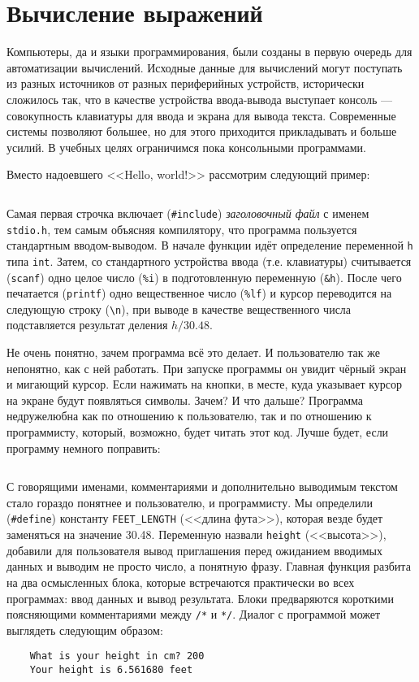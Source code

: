 \section{Вычисление выражений}

Компьютеры, да и языки программирования, были созданы в первую очередь для
автоматизации вычислений. Исходные данные для вычислений могут поступать из
разных источников от разных периферийных устройств, исторически сложилось так,
что в качестве устройства ввода-вывода выступает консоль --- совокупность
клавиатуры для ввода и экрана для вывода текста. Современные системы позволяют
большее, но для этого приходится прикладывать и больше усилий. В учебных целях
ограничимся пока консольными программами.

\zzneedspace
Вместо надоевшего <<Hello, world!>> рассмотрим следующий пример:
%
\inputminted{c}{samples/feet_bad.c}

Самая первая строчка включает (\verb|#include|) \textit{заголовочный файл} с
именем \texttt{stdio.h}, тем самым объясняя компилятору, что программа
пользуется стандартным вводом-выводом. В начале функции идёт определение
переменной \texttt{h} типа \texttt{int}. Затем, со стандартного устройства
ввода (т.е. клавиатуры) считывается (\texttt{scanf}) одно целое число
(\texttt{\%i}) в подготовленную переменную (\verb|&h|). После чего печатается
(\texttt{printf}) одно вещественное число (\texttt{\%lf}) и курсор переводится
на следующую строку (\verb|\n|), при выводе в качестве вещественного числа
подставляется результат деления $h / 30.48$.

Не очень понятно, зачем программа всё это делает. И пользователю так же
непонятно, как с ней работать. При запуске программы он увидит чёрный экран и
мигающий курсор. Если нажимать на кнопки, в месте, куда указывает курсор на
экране будут появляться символы. Зачем? И что дальше? Программа недружелюбна
как по отношению к пользователю, так и по отношению к программисту, который,
возможно, будет читать этот код. Лучше будет, если программу немного
поправить:
%
\inputminted{c}{samples/feet.c}

С говорящими именами, комментариями и дополнительно выводимым текстом стало
гораздо понятнее и пользователю, и программисту. Мы определили
(\verb|#define|) константу \verb|FEET_LENGTH| (<<длина фута>>), которая везде
будет заменяться на значение 30.48. Переменную назвали \texttt{height}
(<<высота>>), добавили для пользователя вывод приглашения перед ожиданием
вводимых данных и выводим не просто число, а понятную фразу. Главная функция
разбита на два осмысленных блока, которые встречаются практически во всех
программах: ввод данных и вывод результата. Блоки предваряются короткими
поясняющими комментариями между \verb|/*| и \verb|*/|. Диалог с программой
может выглядеть следующим образом:
%
\begin{verbatim}
    What is your height in cm? 200
    Your height is 6.561680 feet
\end{verbatim}


